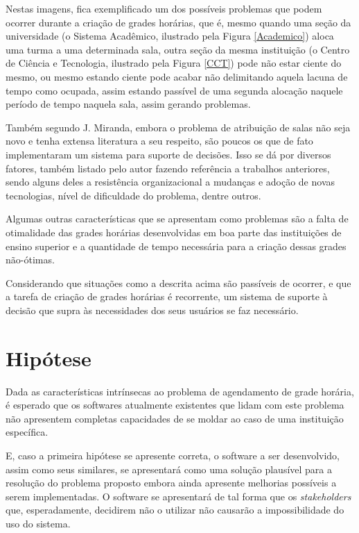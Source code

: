     Nestas imagens, fica exemplificado um dos possíveis problemas que podem ocorrer durante a criação de grades horárias, que é, mesmo quando uma seção da universidade (o Sistema Acadêmico, ilustrado pela Figura \ref{Academico}) aloca uma turma a uma determinada sala, outra seção da mesma instituição (o Centro de Ciência e Tecnologia, ilustrado pela Figura \ref{CCT}) pode não estar ciente do mesmo, ou mesmo estando ciente pode acabar não delimitando aquela lacuna de tempo como ocupada, assim estando passível de uma segunda alocação naquele período de tempo naquela sala, assim gerando problemas.

    Também segundo J. Miranda, embora o problema de atribuição de salas não seja novo e tenha extensa literatura a seu respeito, são poucos os que de fato implementaram um sistema para suporte de decisões. Isso se dá por diversos fatores, também listado pelo autor fazendo referência a trabalhos anteriores, sendo alguns deles a resistência organizacional a mudanças e adoção de novas tecnologias, nível de dificuldade do problema, dentre outros.


    Algumas outras características que se apresentam como problemas são a falta de otimalidade das grades horárias desenvolvidas em boa parte das instituições de ensino superior e a quantidade de tempo necessária para a criação dessas grades não-ótimas.

    Considerando que situações como a descrita acima são passíveis de ocorrer, e que a tarefa de criação de grades horárias é recorrente, um sistema de suporte à decisão que supra às necessidades dos seus usuários se faz necessário.

\section{Hipótese} %

    Dada as características intrínsecas ao problema de agendamento de grade horária, é esperado que os softwares atualmente existentes que lidam com este problema não apresentem completas capacidades de se moldar ao caso de uma instituição específica.

    E, caso a primeira hipótese se apresente correta, o software a ser desenvolvido, assim como seus similares, se apresentará como uma solução plausível para a resolução do problema proposto embora ainda apresente melhorias possíveis a serem implementadas. O software se apresentará de tal forma que os \textit{stakeholders} que, esperadamente, decidirem não o utilizar não causarão a impossibilidade do uso do sistema.

